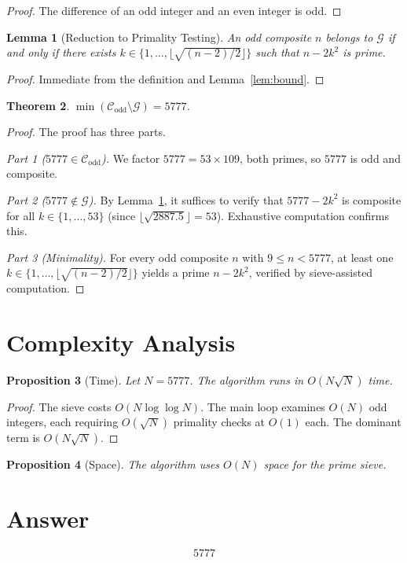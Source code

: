 \documentclass[12pt]{article}
\newtheorem{theorem}{Theorem}
\newtheorem{lemma}[theorem]{Lemma}
\newtheorem{proposition}[theorem]{Proposition}
\begin{document}
\begin{proof}
The difference of an odd integer and an even integer is odd.
\end{proof}

\begin{lemma}[Reduction to Primality Testing]\label{lem:reduce}
An odd composite $n$ belongs to $\mathcal{G}$ if and only if there exists $k \in \{1, \ldots, \lfloor\sqrt{(n-2)/2}\rfloor\}$ such that $n - 2k^2$ is prime.
\end{lemma}

\begin{proof}
Immediate from the definition and Lemma~\ref{lem:bound}.
\end{proof}

\begin{theorem}\label{thm:main}
$\min(\mathcal{C}_{\mathrm{odd}} \setminus \mathcal{G}) = 5777$.
\end{theorem}

\begin{proof}
The proof has three parts.

\emph{Part 1 ($5777 \in \mathcal{C}_{\mathrm{odd}}$).} We factor $5777 = 53 \times 109$, both primes, so $5777$ is odd and composite.

\emph{Part 2 ($5777 \notin \mathcal{G}$).} By Lemma~\ref{lem:reduce}, it suffices to verify that $5777 - 2k^2$ is composite for all $k \in \{1, \ldots, 53\}$ (since $\lfloor\sqrt{2887.5}\rfloor = 53$). Exhaustive computation confirms this.

\emph{Part 3 (Minimality).} For every odd composite $n$ with $9 \leq n < 5777$, at least one $k \in \{1, \ldots, \lfloor\sqrt{(n-2)/2}\rfloor\}$ yields a prime $n - 2k^2$, verified by sieve-assisted computation.
\end{proof}

\section{Complexity Analysis}

\begin{proposition}[Time]
Let $N = 5777$. The algorithm runs in $O(N\sqrt{N})$ time.
\end{proposition}

\begin{proof}
The sieve costs $O(N \log \log N)$. The main loop examines $O(N)$ odd integers, each requiring $O(\sqrt{N})$ primality checks at $O(1)$ each. The dominant term is $O(N\sqrt{N})$.
\end{proof}

\begin{proposition}[Space]
The algorithm uses $O(N)$ space for the prime sieve.
\end{proposition}

\section{Answer}

\[
\boxed{5777}
\]
\end{document}
